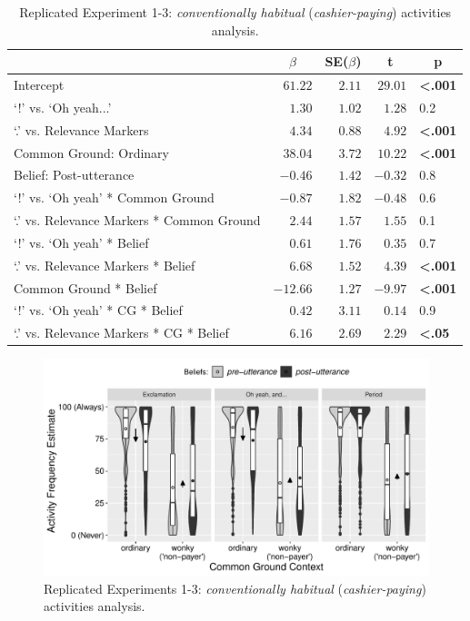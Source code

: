 \documentclass{sp}\usepackage[]{graphicx}\usepackage[]{color}
\makeatletter
\def\maxwidth{ %
  \ifdim\Gin@nat@width>\linewidth
    \linewidth
  \else
    \Gin@nat@width
  \fi
}
\newenvironment{knitrout}{}{} %
\makeatother
\begin{document}
\begin{table}[!tbp]
\caption{Replicated Experiment 1-3: \textit{conventionally habitual} (\textit{cashier-paying}) activities analysis.\label{tab:oldexpall}} 
\begin{center}
\begin{tabular}{lrrrl}
\toprule
\multicolumn{1}{l}{}&\multicolumn{1}{c}{$\beta$}&\multicolumn{1}{c}{SE($\beta$)}&\multicolumn{1}{c}{\textbf{t}}&\multicolumn{1}{c}{\textbf{p}}\tabularnewline
\midrule
Intercept&$ 61.22$&$2.11$&$29.01$&\textbf{\textless .001}\tabularnewline
`!' vs. `Oh yeah...'&$  1.30$&$1.02$&$ 1.28$&0.2\tabularnewline
`.' vs. Relevance Markers&$  4.34$&$0.88$&$ 4.92$&\textbf{\textless .001}\tabularnewline
Common Ground: Ordinary&$ 38.04$&$3.72$&$10.22$&\textbf{\textless .001}\tabularnewline
Belief: Post-utterance&$ -0.46$&$1.42$&$-0.32$&0.8\tabularnewline
`!' vs. `Oh yeah' * Common Ground&$ -0.87$&$1.82$&$-0.48$&0.6\tabularnewline
`.' vs. Relevance Markers * Common Ground&$  2.44$&$1.57$&$ 1.55$&0.1\tabularnewline
`!' vs. `Oh yeah' * Belief&$  0.61$&$1.76$&$ 0.35$&0.7\tabularnewline
`.' vs. Relevance Markers * Belief&$  6.68$&$1.52$&$ 4.39$&\textbf{\textless .001}\tabularnewline
Common Ground * Belief&$-12.66$&$1.27$&$-9.97$&\textbf{\textless .001}\tabularnewline
`!' vs. `Oh yeah' * CG * Belief&$  0.42$&$3.11$&$ 0.14$&0.9\tabularnewline
`.' vs. Relevance Markers * CG * Belief&$  6.16$&$2.69$&$ 2.29$&\textbf{\textless .05}\tabularnewline
\bottomrule
\end{tabular}\end{center}
\end{table}


\begin{figure}\begin{center}
\begin{knitrout}
\color{fgcolor}
\includegraphics[width=\maxwidth]{figure/figure_1-1} 

\end{knitrout}
\end{center}
\caption{Replicated Experiments 1-3: \textit{conventionally habitual} (\textit{cashier-paying}) activities analysis.}
\label{fig:oldexpallhabitual}
\end{figure}
\end{document}
